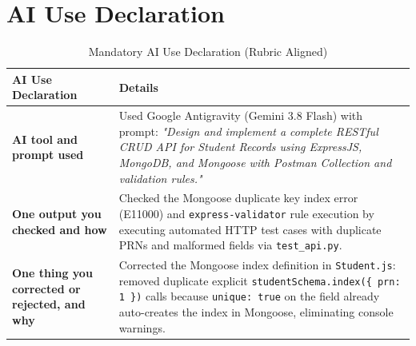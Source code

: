 \documentclass[11pt,a4paper]{article}
\begin{document}
\section{AI Use Declaration}

\begin{table}[h!]
\centering
\small
\begin{tabularx}{\textwidth}{p{4.5cm}X}
\toprule
\textbf{AI Use Declaration} & \textbf{Details} \\
\midrule
\textbf{AI tool and prompt used} & Used Google Antigravity (Gemini 3.8 Flash) with prompt: \textit{"Design and implement a complete RESTful CRUD API for Student Records using ExpressJS, MongoDB, and Mongoose with Postman Collection and validation rules."} \\
\addlinespace
\textbf{One output you checked and how} & Checked the Mongoose duplicate key index error (E11000) and \texttt{express-validator} rule execution by executing automated HTTP test cases with duplicate PRNs and malformed fields via \texttt{test\_api.py}. \\
\addlinespace
\textbf{One thing you corrected or rejected, and why} & Corrected the Mongoose index definition in \texttt{Student.js}: removed duplicate explicit \texttt{studentSchema.index(\{ prn: 1 \})} calls because \texttt{unique: true} on the field already auto-creates the index in Mongoose, eliminating console warnings. \\
\bottomrule
\end{tabularx}
\caption{Mandatory AI Use Declaration (Rubric Aligned)}
\end{table}
\end{document}
